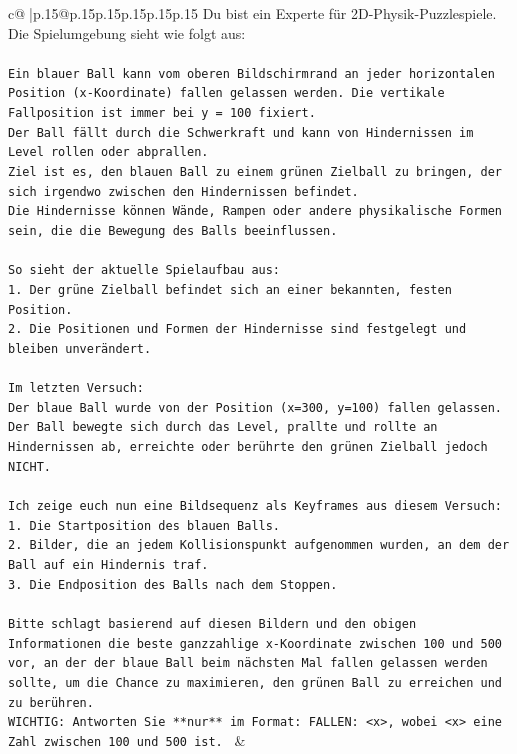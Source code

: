 \documentclass{article}
\begin{document}
{\begin{supertabular}{c@{$\;$}|p{.15\linewidth}@{}p{.15\linewidth}p{.15\linewidth}p{.15\linewidth}p{.15\linewidth}p{.15\linewidth}}
{{{	 Du bist ein Experte für 2D-Physik-Puzzlespiele. Die Spielumgebung sieht wie folgt aus:\\ \tt \\ \tt Ein blauer Ball kann vom oberen Bildschirmrand an jeder horizontalen Position (x-Koordinate) fallen gelassen werden. Die vertikale Fallposition ist immer bei y = 100 fixiert.\\ \tt Der Ball fällt durch die Schwerkraft und kann von Hindernissen im Level rollen oder abprallen.\\ \tt Ziel ist es, den blauen Ball zu einem grünen Zielball zu bringen, der sich irgendwo zwischen den Hindernissen befindet.\\ \tt Die Hindernisse können Wände, Rampen oder andere physikalische Formen sein, die die Bewegung des Balls beeinflussen.\\ \tt \\ \tt So sieht der aktuelle Spielaufbau aus:\\ \tt 1. Der grüne Zielball befindet sich an einer bekannten, festen Position.\\ \tt 2. Die Positionen und Formen der Hindernisse sind festgelegt und bleiben unverändert.\\ \tt \\ \tt Im letzten Versuch:\\ \tt Der blaue Ball wurde von der Position (x=300, y=100) fallen gelassen. Der Ball bewegte sich durch das Level, prallte und rollte an Hindernissen ab, erreichte oder berührte den grünen Zielball jedoch NICHT.\\ \tt \\ \tt Ich zeige euch nun eine Bildsequenz als Keyframes aus diesem Versuch:\\ \tt 1. Die Startposition des blauen Balls.\\ \tt 2. Bilder, die an jedem Kollisionspunkt aufgenommen wurden, an dem der Ball auf ein Hindernis traf.\\ \tt 3. Die Endposition des Balls nach dem Stoppen.\\ \tt \\ \tt Bitte schlagt basierend auf diesen Bildern und den obigen Informationen die beste ganzzahlige x-Koordinate zwischen 100 und 500 vor, an der der blaue Ball beim nächsten Mal fallen gelassen werden sollte, um die Chance zu maximieren, den grünen Ball zu erreichen und zu berühren.\\ \tt WICHTIG: Antworten Sie **nur** im Format: FALLEN: <x>, wobei <x> eine Zahl zwischen 100 und 500 ist. 
	  } 
	   } 
	   } 
	 & \\ 
 


\end{supertabular}}
\end{document}
